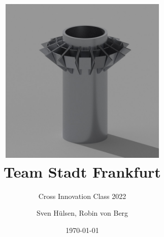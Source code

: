 \documentclass[11pt,oneside,headsepline,a4paper,ngerman]{scrreprt}
\newcommand{\vcontext}{Softwareprojekt}
\newcommand{\vprof}{Prof. Hoffmann}
\newcommand{\vsubject}{Projektbericht}
\newcommand{\vtitle}{Team Stadt Frankfurt}
\newcommand{\vsubtitle}{Cross Innovation Class 2022}
\newcommand{\vauthor}{Sven Hülsen, Robin von Berg}
\begin{document}
\titlehead{\vcontext{}\\\vprof{}}
\subject{\vsubject{}}
\title{\includegraphics[width=8cm]{media/01_project/render_bin.jpg}\\\vtitle{}}
\subtitle{\vsubtitle{}}
\author{\vauthor{}}
\date{\today}

\maketitle


\tableofcontents









\setcounter{biburlnumpenalty}{8000}

\printbibliography{}

\listoffigures{}
\end{document}
